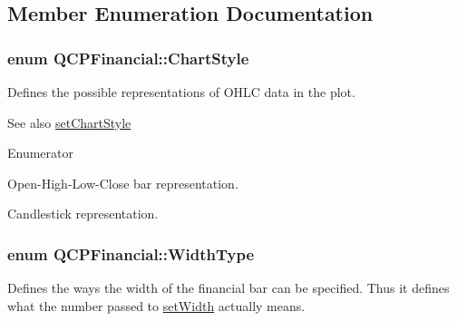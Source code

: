 \subsection{Member Enumeration Documentation}
\subsubsection[{\texorpdfstring{Chart\+Style}{ChartStyle}}]{\setlength{\rightskip}{0pt plus 5cm}enum {\bf Q\+C\+P\+Financial\+::\+Chart\+Style}}\hypertarget{classQCPFinancial_a0f800e21ee98d646dfc6f8f89d10ebfb}{}\label{classQCPFinancial_a0f800e21ee98d646dfc6f8f89d10ebfb}
Defines the possible representations of O\+H\+LC data in the plot.

\begin{DoxySeeAlso}{See also}
\hyperlink{classQCPFinancial_a5a59175d36279d71596e64d7bb65596f}{set\+Chart\+Style} 
\end{DoxySeeAlso}
\begin{Desc}
\item[Enumerator]\par
\begin{description}
\item[{\em 
cs\+Ohlc\hypertarget{classQCPFinancial_a0f800e21ee98d646dfc6f8f89d10ebfba3a516016c9298d3e95dd82aa203c4390}{}\label{classQCPFinancial_a0f800e21ee98d646dfc6f8f89d10ebfba3a516016c9298d3e95dd82aa203c4390}
}]Open-\/\+High-\/\+Low-\/\+Close bar representation. \item[{\em 
cs\+Candlestick\hypertarget{classQCPFinancial_a0f800e21ee98d646dfc6f8f89d10ebfbac803cbd39f26e3f206bcc7028679e62f}{}\label{classQCPFinancial_a0f800e21ee98d646dfc6f8f89d10ebfbac803cbd39f26e3f206bcc7028679e62f}
}]Candlestick representation. \end{description}
\end{Desc}
\subsubsection[{\texorpdfstring{Width\+Type}{WidthType}}]{\setlength{\rightskip}{0pt plus 5cm}enum {\bf Q\+C\+P\+Financial\+::\+Width\+Type}}\hypertarget{classQCPFinancial_aef1761dda71a53dc5269685e9e492626}{}\label{classQCPFinancial_aef1761dda71a53dc5269685e9e492626}
Defines the ways the width of the financial bar can be specified. Thus it defines what the number passed to \hyperlink{classQCPFinancial_a99633f8bac86a61d534ae5eeb1a3068f}{set\+Width} actually means.

